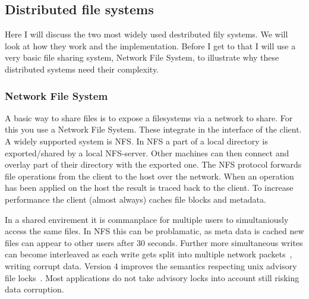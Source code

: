 \subsection{Distributed file systems}
Here I will discuss the two most widely used destributed fily systems. We will look at how they work and the implementation. Before I get to that I will use a very basic file sharing system, Network File System, to illustrate why these distributed systems need their complexity.



\subsubsection*{Network File System}
A basic way to share files is to expose a filesystems via a network to share. For this you use a Network File System. These integrate in the interface of the client. A widely supported system is \textsc{NFS}. In \textsc{NFS} a part of a local directory is exported/shared by a local \textsc{NFS}-server. Other machines can then connect and overlay part of their directory with the exported one. The NFS protocol forwards file operations from the client to the host over the network. When an operation has been applied on the host the result is traced back to the client. To increase performance the client (almost always) caches file blocks and metadata. 

In a shared envirement it is commanplace for multiple users to simultaniously access the same files. In \textsc{NFS} this can be problamatic, as meta data is cached new files can appear to other users after 30 seconds. Further more simultaneous writes can become interleaved as each write gets split into multiple network packets~\cite[p. 527]{os}, writing corrupt data. Version 4 improves the semantics respecting unix advisory file locks~\cite{rfc3530}. Most applications do not take advisory locks into account still risking data corruption. 

